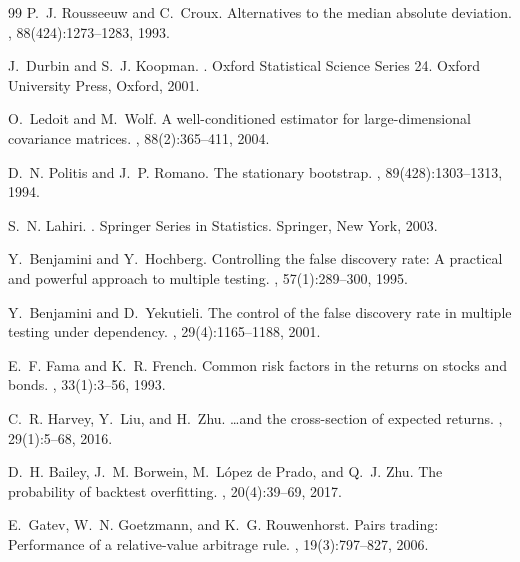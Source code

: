\documentclass[11pt,a4paper]{article}
\begin{document}
\FloatBarrier
\begin{thebibliography}{99}
P.~J. Rousseeuw and C.~Croux.
\newblock Alternatives to the median absolute deviation.
,
  88(424):1273--1283, 1993.

J.~Durbin and S.~J. Koopman.
.
\newblock Oxford Statistical Science Series 24. Oxford University Press,
  Oxford, 2001.

O.~Ledoit and M.~Wolf.
\newblock A well-conditioned estimator for large-dimensional covariance matrices.
, 88(2):365--411, 2004.

D.~N. Politis and J.~P. Romano.
\newblock The stationary bootstrap.
, 89(428):1303--1313, 1994.

S.~N. Lahiri.
.
\newblock Springer Series in Statistics. Springer, New York, 2003.

Y.~Benjamini and Y.~Hochberg.
\newblock Controlling the false discovery rate: A practical and powerful approach to multiple testing.
, 57(1):289--300, 1995.

Y.~Benjamini and D.~Yekutieli.
\newblock The control of the false discovery rate in multiple testing under dependency.
, 29(4):1165--1188, 2001.

E.~F. Fama and K.~R. French.
\newblock Common risk factors in the returns on stocks and bonds.
, 33(1):3--56, 1993.

C.~R. Harvey, Y.~Liu, and H.~Zhu.
\newblock \dots and the cross-section of expected returns.
, 29(1):5--68, 2016.

D.~H. Bailey, J.~M. Borwein, M.~L\'{o}pez de Prado, and Q.~J. Zhu.
\newblock The probability of backtest overfitting.
, 20(4):39--69, 2017.

E.~Gatev, W.~N. Goetzmann, and K.~G. Rouwenhorst.
\newblock Pairs trading: Performance of a relative-value arbitrage rule.
, 19(3):797--827, 2006.


\end{thebibliography}
\end{document}
